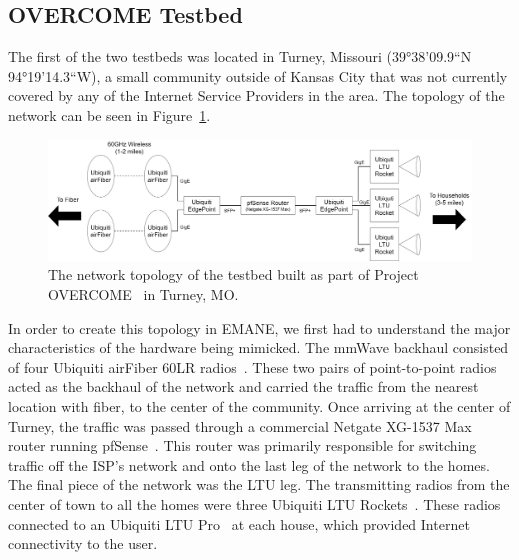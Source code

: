 \subsection{OVERCOME Testbed}
The first of the two testbeds was located in Turney, Missouri (39°38'09.9``N 94°19'14.3``W), a small community outside of Kansas City that was not currently covered by any of the Internet Service Providers in the area.
The topology of the network can be seen in Figure~\ref{overcome_topology}.
\begin{figure}[!ht]
    \centering
    \includegraphics[width=\textwidth,keepaspectratio]{Images/Chpt3/OVERCOME_Topology.png}
    \caption{The network topology of the testbed built as part of Project OVERCOME~\cite{projovercome} in Turney, MO.}
    \label{overcome_topology}
\end{figure}
In order to create this topology in EMANE, we first had to understand the major characteristics of the hardware being mimicked.
The mmWave backhaul consisted of four Ubiquiti airFiber 60LR radios~\cite{airfiber}.
These two pairs of point-to-point radios acted as the backhaul of the network and carried the traffic from the nearest location with fiber, to the center of the community.
Once arriving at the center of Turney, the traffic was passed through a commercial Netgate XG-1537 Max router running pfSense~\cite{netgate_1537}.
This router was primarily responsible for switching traffic off the ISP's network and onto the last leg of the network to the homes.
The final piece of the network was the LTU leg.
The transmitting radios from the center of town to all the homes were three Ubiquiti LTU Rockets~\cite{lturocket}.
These radios connected to an Ubiquiti LTU Pro~\cite{ltupro} at each house, which provided Internet connectivity to the user. 

